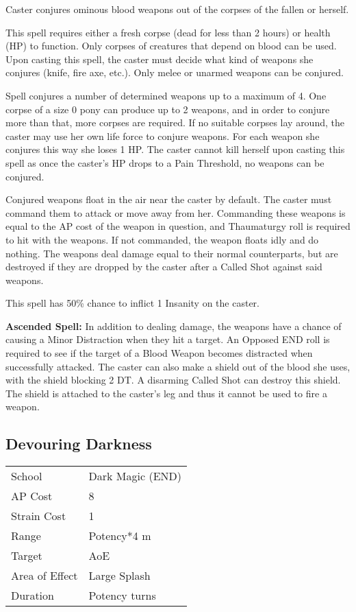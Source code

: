 \documentclass[11pt,a4paper,twocolumn]{book}
\begin{document}
\medskip

Caster conjures ominous blood weapons out of the corpses of the fallen or herself.

This spell requires either a fresh corpse (dead for less than 2 hours) or health (HP) to function. Only corpses of creatures that depend on blood can be used. Upon casting this spell, the caster must decide what kind of weapons she conjures (knife, fire axe, etc.). Only melee or unarmed weapons can be conjured.

Spell conjures a number of determined weapons up to a maximum of 4. One corpse of a size 0 pony can produce up to 2 weapons, and in order to conjure more than that, more corpses are required. If no suitable corpses lay around, the caster may use her own life force to conjure weapons. For each weapon she conjures this way she loses 1 HP. The caster cannot kill herself upon casting this spell as once the caster's HP drops to a Pain Threshold, no weapons can be conjured.

Conjured weapons float in the air near the caster by default. The caster must command them to attack or move away from her. Commanding these weapons is equal to the AP cost of the weapon in question, and Thaumaturgy roll is required to hit with the weapons. If not commanded, the weapon floats idly and do nothing. The weapons deal damage equal to their normal counterparts, but are destroyed if they are dropped by the caster after a Called Shot against said weapons.

This spell has 50\% chance to inflict 1 Insanity on the caster.

\bigskip

\textbf{Ascended Spell:} In addition to dealing damage, the weapons have a chance of causing a Minor Distraction when they hit a target. An Opposed END roll is required to see if the target of a Blood Weapon becomes distracted when successfully attacked. The caster can also make a shield out of the blood she uses, with the shield blocking 2 DT. A disarming Called Shot can destroy this shield. The shield is attached to the caster's leg and thus it cannot be used to fire a weapon.


\subsection*{Devouring Darkness}
{
	\begin{tabu} to 75mm{| X[l,4] | X[l,7] |}
		\hline
		School 			& Dark Magic (END) 	\\
		AP Cost	      	& 8 				\\
		Strain Cost     & 1 				\\
		Range     		& Potency*4 m		\\
		Target      	& AoE				\\
		Area of Effect  & Large Splash  	 	\\
		Duration     	& Potency turns 	\\ \hline
	\end{tabu}
	
}
\end{document}

